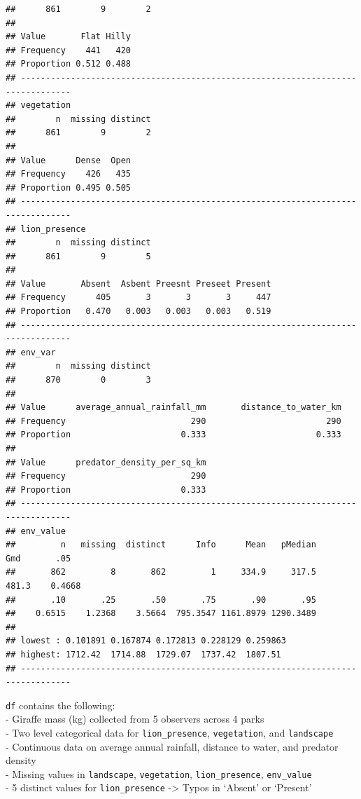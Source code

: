 \documentclass[
]{article}
\begin{document}
\begin{verbatim}
##      861        9        2 
##                       
## Value       Flat Hilly
## Frequency    441   420
## Proportion 0.512 0.488
## --------------------------------------------------------------------------------
## vegetation 
##        n  missing distinct 
##      861        9        2 
##                       
## Value      Dense  Open
## Frequency    426   435
## Proportion 0.495 0.505
## --------------------------------------------------------------------------------
## lion_presence 
##        n  missing distinct 
##      861        9        5 
##                                                   
## Value       Absent  Asbent Preesnt Preseet Present
## Frequency      405       3       3       3     447
## Proportion   0.470   0.003   0.003   0.003   0.519
## --------------------------------------------------------------------------------
## env_var 
##        n  missing distinct 
##      870        0        3 
##                                                                 
## Value      average_annual_rainfall_mm       distance_to_water_km
## Frequency                         290                        290
## Proportion                      0.333                      0.333
##                                      
## Value      predator_density_per_sq_km
## Frequency                         290
## Proportion                      0.333
## --------------------------------------------------------------------------------
## env_value 
##         n   missing  distinct      Info      Mean   pMedian       Gmd       .05 
##       862         8       862         1     334.9     317.5     481.3    0.4668 
##       .10       .25       .50       .75       .90       .95 
##    0.6515    1.2368    3.5664  795.3547 1161.8979 1290.3489 
## 
## lowest : 0.101891 0.167874 0.172813 0.228129 0.259863
## highest: 1712.42  1714.88  1729.07  1737.42  1807.51 
## --------------------------------------------------------------------------------
\end{verbatim}

\texttt{df} contains the following:\\
- Giraffe mass (kg) collected from 5 observers across 4 parks\\
- Two level categorical data for \texttt{lion\_presence},
\texttt{vegetation}, and \texttt{landscape}\\
- Continuous data on average annual rainfall, distance to water, and
predator density\\
- Missing values in \texttt{landscape}, \texttt{vegetation},
\texttt{lion\_presence}, \texttt{env\_value}\\
- 5 distinct values for \texttt{lion\_presence} -\textgreater{} Typos in
`Absent' or `Present'
\end{document}
